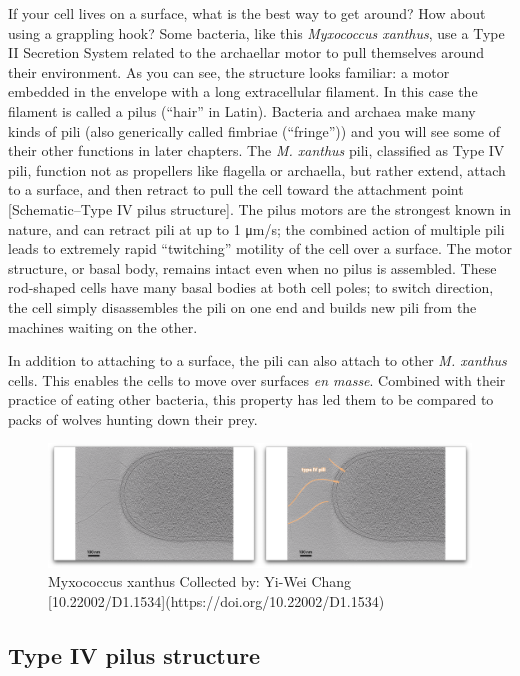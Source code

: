 \documentclass[]{tufte-book}
\begin{document}
If your cell lives on a surface, what is the best way to get around? How
about using a grappling hook? Some bacteria, like this \emph{Myxococcus
xanthus}, use a Type II Secretion System related to the archaellar motor
to pull themselves around their environment. As you can see, the
structure looks familiar: a motor embedded in the envelope with a long
extracellular filament. In this case the filament is called a pilus
(``hair'' in Latin). Bacteria and archaea make many kinds of pili (also
generically called fimbriae (``fringe'')) and you will see some of their
other functions in later chapters. The \emph{M. xanthus} pili,
classified as Type IV pili, function not as propellers like flagella or
archaella, but rather extend, attach to a surface, and then retract to
pull the cell toward the attachment point {[}Schematic--Type IV pilus
structure{]}. The pilus motors are the strongest known in nature, and
can retract pili at up to 1 μm/s; the combined action of multiple pili
leads to extremely rapid ``twitching'' motility of the cell over a
surface. The motor structure, or basal body, remains intact even when no
pilus is assembled. These rod-shaped cells have many basal bodies at
both cell poles; to switch direction, the cell simply disassembles the
pili on one end and builds new pili from the machines waiting on the
other.

In addition to attaching to a surface, the pili can also attach to other
\emph{M. xanthus} cells. This enables the cells to move over surfaces
\emph{en masse}. Combined with their practice of eating other bacteria,
this property has led them to be compared to packs of wolves hunting
down their prey.

\begin{figure}
\includegraphics{movie_stills/6_10} \caption[Myxococcus xanthus Collected by]{Myxococcus xanthus Collected by: Yi-Wei Chang [10.22002/D1.1534](https://doi.org/10.22002/D1.1534)}\label{fig:unnamed-chunk-118}
\end{figure}

\subsection{Type IV pilus structure}\label{Type_IV_pilus_structure}
\end{document}
